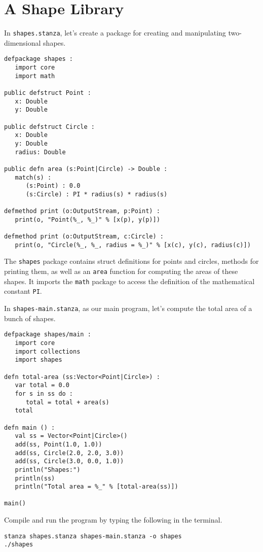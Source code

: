 \documentclass[10pt,oneside]{book}
\begin{document}
\section{A Shape Library}
In \texttt{\frenchspacing shapes.stanza}, let's create a package for creating and manipulating two-dimensional shapes.
\begin{lstlisting}
defpackage shapes :
   import core
   import math

public defstruct Point :
   x: Double
   y: Double

public defstruct Circle :
   x: Double
   y: Double
   radius: Double

public defn area (s:Point|Circle) -> Double :
   match(s) :
      (s:Point) : 0.0
      (s:Circle) : PI * radius(s) * radius(s)

defmethod print (o:OutputStream, p:Point) :
   print(o, "Point(%_, %_)" % [x(p), y(p)])

defmethod print (o:OutputStream, c:Circle) :
   print(o, "Circle(%_, %_, radius = %_)" % [x(c), y(c), radius(c)])
\end{lstlisting}
The \texttt{\frenchspacing shapes} package contains struct definitions for points and circles, methods for printing them, as well as an \texttt{\frenchspacing area} function for computing the areas of these shapes. It imports the \texttt{\frenchspacing math} package to access the definition of the mathematical constant \texttt{\frenchspacing PI}. 

In \texttt{\frenchspacing shapes-main.stanza}, as our main program, let's compute the total area of a bunch of shapes. 
\begin{lstlisting}
defpackage shapes/main :
   import core
   import collections
   import shapes

defn total-area (ss:Vector<Point|Circle>) :
   var total = 0.0
   for s in ss do :
      total = total + area(s)
   total   

defn main () :
   val ss = Vector<Point|Circle>()
   add(ss, Point(1.0, 1.0))
   add(ss, Circle(2.0, 2.0, 3.0))
   add(ss, Circle(3.0, 0.0, 1.0))
   println("Shapes:")
   println(ss)
   println("Total area = %_" % [total-area(ss)])

main()
\end{lstlisting}

Compile and run the program by typing the following in the terminal.
\begin{lstlisting}
stanza shapes.stanza shapes-main.stanza -o shapes
./shapes
\end{lstlisting}
\end{document}
